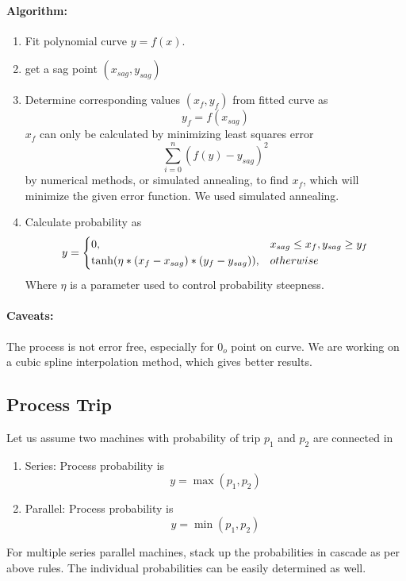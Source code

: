 \documentclass[20pt, a4paper]{report}
\begin{document}
			 \paragraph{Algorithm:}
			 \begin{enumerate}
			 \item Fit polynomial curve $y = f(x)$.
			 \item get a sag point $(x_{sag}, y_{sag})$
			 \item Determine corresponding values $(x_{f},y_{f})$ from fitted curve as $$ y_{f} = f(x_{sag})$$
			 $x_{f}$ can only be calculated by minimizing least squares error 
			 $$\sum_{i=0}^{n}(f(y)-y_{sag})^{2}$$
			 by numerical methods, or simulated annealing, to find $x_{f}$, which will minimize the given error function. We used simulated annealing.
			 \item Calculate probability as 
			 \begin{equation*}
			 	y = \begin{dcases}
			 	0,& x_{sag} \leq x_{f}, y_{sag} \geq y_{f}\\
			 	\tanh(\eta*(x_{f}-x_{sag})*(y_{f}-y_{sag})),&otherwise\\
			 	\end{dcases}
\end{equation*}		
		Where $\eta$ is a parameter used to control probability steepness.	
		\end{enumerate}
		
		\paragraph{Caveats:}The process is not error free, especially for $0_{o}$ point on curve. We are working on a cubic spline interpolation method, which gives better results. 
			
			\subsection{Process Trip}
			Let us assume two machines with probability of trip $p_{1}$ and $p_{2}$ are connected in \begin{enumerate}
			\item{Series:} Process probability is $$ y = \max{(p_{1}, p_{2})}$$ 
			\item{Parallel:} Process probability is $$ y = \min{(p_{1}, p_{2})}$$
			\end{enumerate}
			
			For multiple series parallel machines, stack up the probabilities in cascade as per above rules. The individual probabilities can be easily determined as well.		
		
	
\end{document}
